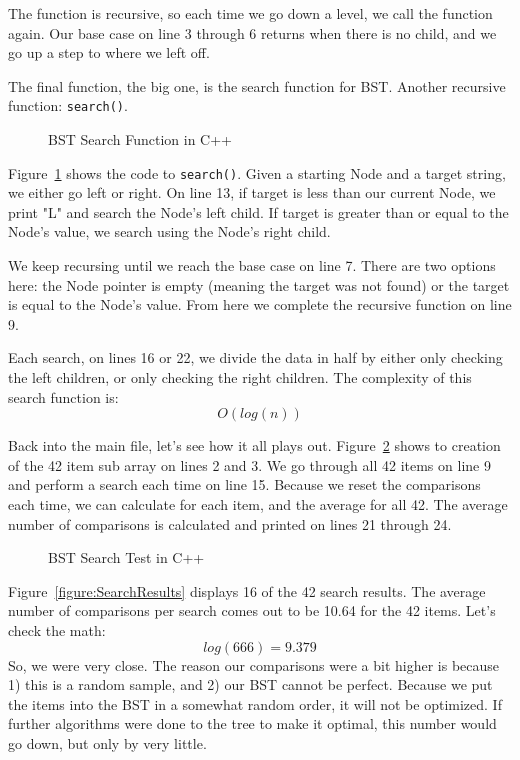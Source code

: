 \documentclass[letterpaper, 10pt,DIV=13]{scrartcl}
\numberwithin{equation}{section} %
\numberwithin{figure}{section} %
\numberwithin{table}{section} %
\begin{document}
The function is recursive, so each time we go down a level, we call the function again. Our base case on line 3 through 6 returns when there is no child, and we go up a step to where we left off.


The final function, the big one, is the search function for BST. Another recursive function: \texttt{search()}.      
\begin{figure}[h] 
    \centering 
    
    \caption{BST Search Function in C++}
    \label{figure:Search}
\end{figure}

Figure~\ref{figure:Search} shows the code to \texttt{search()}. Given a starting Node and a target string, we either go left or right. On line 13, if target is less than our current Node, we print "L" and search the Node's left child.
If target is greater than or equal to the Node's value, we search using the Node's right child.

We keep recursing until we reach the base case on line 7. There are two options here: the Node pointer is empty (meaning the target was not found) or the target is equal to the Node's value. From here we complete the recursive function on line 9.

Each search, on lines 16 or 22, we divide the data in half by either only checking the left children, or only checking the right children. The complexity of this search function is:
\[O(log(n))\] 


\pagebreak

Back into the main file, let's see how it all plays out. Figure~\ref{figure:SearchMain} shows to creation of the 42 item sub array on lines 2 and 3. We go through all 42 items on line 9 and perform a search each time on line 15. Because we reset the comparisons each time, we can calculate for each item, and the average for all 42. The average number of comparisons is calculated and printed on lines 21 through 24.

\begin{figure}[h] 
    \centering 
    
    \caption{BST Search Test in C++}
    \label{figure:SearchMain}
\end{figure}

Figure~\ref{figure:SearchResults} displays 16 of the 42 search results. The average number of comparisons per search comes out to be 10.64 for the 42 items. Let's check the math:
\[log(666) = 9.379\] 
So, we were very close. The reason our comparisons were a bit higher is because 1) this is a random sample, and 2) our BST cannot be perfect. Because we put the items into the BST in a somewhat random order, it will not be optimized. If further algorithms were done to the tree to make it optimal, this number would go down, but only by very little.
\end{document}
